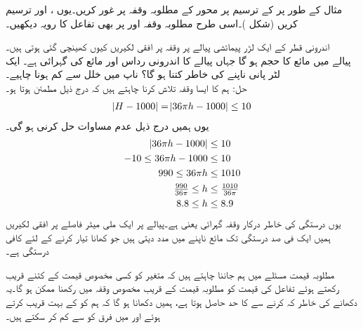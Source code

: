 مثال کے طور پر  کے ترسیم پر  محور کے مطلوبہ وقفہ  پر غور کریں۔یوں ،  اور  ترسیم کریں (شکل )۔اسی طرح مطلوبہ وقفہ  اور  پر بھی تفاعل کا رویہ دیکھیں۔

 اندرونی قطر کے ایک لڑر پیمائشی پیالے پر  وقفہ پر افقی لکیریں کیوں کھینچی گئی ہوتی ہیں۔\\
پیالے میں مائع کا حجم  ہو گا جہاں پیالے کا اندرونی رداس  اور مائع کی گہرائی  ہے۔ ایک لٹر  پانی ناپنے کی خاطر  کتنا ہو گا؟ ناپ میں خلل  سے کم ہونا چاہیے۔\\
حل:\quad
ہم  کا ایسا وقفہ تلاش کرنا چاہتے ہیں کہ درج ذیل مطمئن ہوتا ہو۔
\begin{align*}
\abs{H-1000}=\abs{36\pi h-1000}\le 10
\end{align*}
یوں ہمیں درج ذیل عدم مساوات حل کرنی ہو گی۔
\begin{align*}
\abs{36\pi h-1000}&\le 10\\
-10\le 36\pi h-1000&\le 10\\
990\le 36\pi h&\le 1010\\
\tfrac{990}{36\pi}\le h &\le \tfrac{1010}{36\pi}\\
8.8\le h &\le 8.9
\end{align*}
یوں  درستگی کی خاطر درکار وقفہ گہرائی  یعنی  ہے۔پیالے پر ایک ملی میٹر فاصلے پر افقی لکیریں ہمیں ایک فی صد درستگی تک مائع ناپنے میں مدد دیتی ہیں جو کھانا تیار کرنے کے لئے کافی درستگی ہے۔

مطلوبہ قیمت مسئلے میں ہم جاننا چاہتے ہیں کہ متغیر  کو کسی مخصوص قیمت  کے کتنے قریب رکھتے ہوئے تفاعل  کی قیمت کو مطلوبہ قیمت  کے قریب مخصوص وقفہ میں رکھنا ممکن ہو گا۔یہ دکھانے کی خاطر کہ  کرنے سے  کا حد  حاصل ہوتا ہے، ہمیں دکھانا ہو گا کہ ہم 
 کو  کے بہت قریب کرتے ہوئے   اور  میں فرق کو  سے کم کر سکتے ہیں۔

